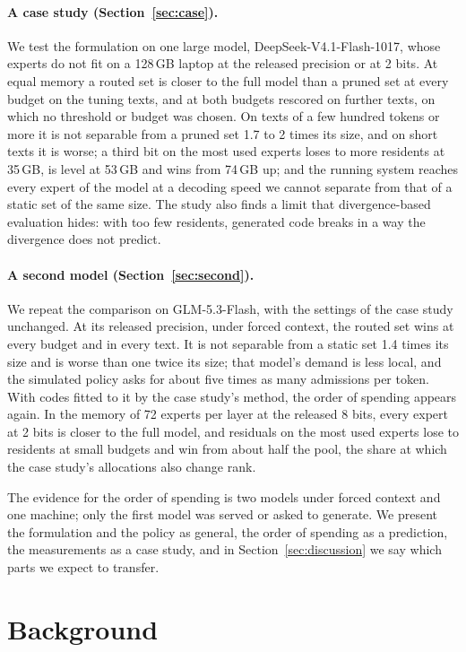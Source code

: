 \documentclass[11pt]{article}
\begin{document}
\paragraph{A case study (Section~\ref{sec:case}).} We test the formulation on one large model, DeepSeek-V4.1-Flash-1017, whose experts do not fit on a 128\,GB laptop at the released precision or
at 2 bits. At equal memory a routed set is closer to the full model than a pruned set at every
budget on the tuning texts, and at both budgets rescored on further texts, on which no threshold or budget was chosen. On texts of a few hundred tokens or more it is not separable from a pruned set 1.7 to 2 times its size, and on short texts it is worse; a third bit on the most used experts loses to more residents at 35\,GB, is level
at 53\,GB and wins from 74\,GB up; and the running system reaches every expert of the model at a decoding speed we cannot separate from that of a static set of the same size. The study also finds a limit that divergence-based evaluation hides: with too few residents, generated code breaks in a way the divergence does not predict.

\paragraph{A second model (Section~\ref{sec:second}).} We repeat the comparison on GLM-5.3-Flash, with the settings of the case study unchanged. At its released precision, under forced context, the routed set wins at every budget and in every text. It is not separable from a static set 1.4 times its size and is worse than one twice its size; that model's demand is less local, and the simulated policy asks for about five times as many admissions per token. With codes fitted to it by the case study's method, the order of spending appears again. In the memory of 72 experts per layer at the released 8 bits, every expert at 2 bits is closer to the full model, and residuals on the most used experts lose to residents at small budgets and win from about half the pool, the share at which the case study's allocations also change rank.

The evidence for the order of spending is two models under forced context and one machine; only the first model was served or asked to generate. We present the formulation and
the policy as general, the order of spending as a prediction, the measurements as a case study, and in
Section~\ref{sec:discussion} we say which parts we expect to transfer.

\section{Background}
\label{sec:background}
\end{document}
